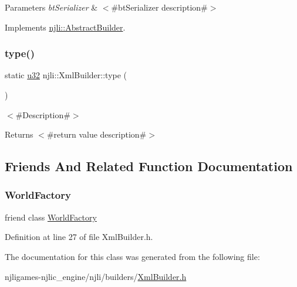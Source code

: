 \begin{DoxyParams}{Parameters}
{\em bt\+Serializer} & $<$\#bt\+Serializer description\#$>$ \\
\hline
\end{DoxyParams}


Implements \mbox{\hyperlink{classnjli_1_1_abstract_builder_ab66b774e02ccb9da554c9aab7fa6d981}{njli\+::\+Abstract\+Builder}}.

\mbox{\label{classnjli_1_1_xml_builder_ae82ac8b0e656f4f212d447ef1e9c3526}} 
\subsubsection{\texorpdfstring{type()}{type()}}
{\footnotesize\ttfamily static \mbox{\hyperlink{_util_8h_a10e94b422ef0c20dcdec20d31a1f5049}{u32}} njli\+::\+Xml\+Builder\+::type (\begin{DoxyParamCaption}{ }\end{DoxyParamCaption})\hspace{0.3cm}{\ttfamily [static]}}

$<$\#\+Description\#$>$

\begin{DoxyReturn}{Returns}
$<$\#return value description\#$>$ 
\end{DoxyReturn}


\subsection{Friends And Related Function Documentation}
\mbox{\label{classnjli_1_1_xml_builder_acb96ebb09abe8f2a37a915a842babfac}} 
\subsubsection{\texorpdfstring{World\+Factory}{WorldFactory}}
{\footnotesize\ttfamily friend class \mbox{\hyperlink{classnjli_1_1_world_factory}{World\+Factory}}\hspace{0.3cm}{\ttfamily [friend]}}



Definition at line 27 of file Xml\+Builder.\+h.



The documentation for this class was generated from the following file\+:\begin{DoxyCompactItemize}
\item 
njligames-\/njlic\+\_\+engine/njli/builders/\mbox{\hyperlink{_xml_builder_8h}{Xml\+Builder.\+h}}\end{DoxyCompactItemize}

